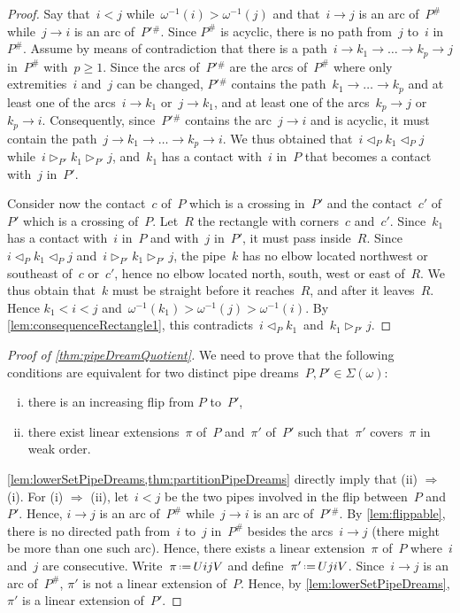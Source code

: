 \documentclass{amsart}
\theoremstyle{definition}
\newcommand{\eqdef}{\mbox{\,\raisebox{0.2ex}{\scriptsize\ensuremath{\mathrm:}}\ensuremath{=}\,}} %
\newcommand{\contact}{^\#} %
\newcommand{\acyclicPipeDreams}{\Sigma} %
\newcommand{\less}{\vartriangleleft} %
\newcommand{\more}{\vartriangleright} %
\newcommand{\contactLess}[1]{\less_{#1}} %
\newcommand{\contactMore}[1]{\more_{#1}} %
\begin{document}
\begin{proof}
Say that~$i < j$ while~$\omega^{-1}(i) > \omega^{-1}(j)$ and that~$i \to j$ is an arc of~$P\contact$ while~$j \to i$ is an arc of~$P'{}\contact$.
Since $P\contact$ is acyclic, there is no path from~$j$ to~$i$ in~$P\contact$.
Assume by means of contradiction that there is a path~$i \to k_1 \to \dots \to k_p \to j$ in~$P\contact$ with~$p \ge 1$.
Since the arcs of~$P'{}\contact$ are the arcs of~$P\contact$ where only extremities~$i$ and~$j$ can be changed, $P'{}\contact$ contains the path~$k_1 \to \dots \to k_p$ and at least one of the arcs~$i \to k_1$ or~$j \to k_1$, and at least one of the arcs~$k_p \to j$ or~$k_p \to i$.
Consequently, since~$P'{}\contact$ contains the arc~$j \to i$ and is acyclic, it must contain the path~$j \to k_1 \to \dots \to k_p \to i$.
We thus obtained that~$i \contactLess{P} k_1 \contactLess{P} j$ while~$i \contactMore{P'} k_1 \contactMore{P'} j$, and~$k_1$ has a contact with~$i$ in~$P$ that becomes a contact with~$j$ in~$P'$.

Consider now the contact~$c$ of~$P$ which is a crossing in~$P'$ and the contact~$c'$ of~$P'$ which is a crossing of~$P$.
Let~$R$ the rectangle with corners~$c$ and~$c'$.
Since~$k_1$ has a contact with~$i$ in~$P$ and with~$j$ in~$P'$, it must pass inside~$R$.
Since~$i \contactLess{P} k_1 \contactLess{P} j$ and~$i \contactMore{P'} k_1 \contactMore{P'} j$, the pipe~$k$ has no elbow located northwest or southeast of~$c$ or~$c'$, hence no elbow located north, south, west or east of~$R$.
We thus obtain that~$k$ must be straight before it reaches~$R$, and after it leaves~$R$.
Hence $k_1 < i < j$ and~$\omega^{-1}(k_1) > \omega^{-1}(j) > \omega^{-1}(i)$.
By \cref{lem:consequenceRectangle1}, this contradicts~$i \contactLess{P} k_1$~and~$k_1 \contactMore{P'} j$.
\end{proof}

\begin{proof}[Proof of \cref{thm:pipeDreamQuotient}]
We need to prove that the following conditions are equivalent for two distinct pipe dreams~$P,P' \in \acyclicPipeDreams(\omega)$:
\begin{enumerate}[(i)]
\item there is an increasing flip from $P$ to~$P'$,
\item there exist linear extensions~$\pi$ of~$P$ and~$\pi'$ of~$P'$ such that~$\pi'$ covers~$\pi$ in weak order.
\end{enumerate}
\cref{lem:lowerSetPipeDreams,thm:partitionPipeDreams} directly imply that (ii) $\Rightarrow$ (i).
For (i) $\Rightarrow$ (ii), let~$i < j$ be the two pipes involved in the flip between~$P$ and~$P'$.
Hence, $i \to j$ is an arc of~$P\contact$ while~$j \to i$ is an arc of~$P'{}\contact$.
By \cref{lem:flippable}, there is no directed path from~$i$ to~$j$ in~$P\contact$ besides the arcs~$i \to j$ (there might be more than one such arc).
Hence, there exists a linear extension~$\pi$ of~$P$ where~$i$ and~$j$ are consecutive.
Write~$\pi \eqdef UijV$ and define~$\pi' \eqdef UjiV$.
Since~$i \to j$ is an arc of~$P\contact$, $\pi'$ is not a linear extension of~$P$.
Hence, by \cref{lem:lowerSetPipeDreams}, $\pi'$ is a linear extension of~$P'$.
\end{proof}
\end{document}
